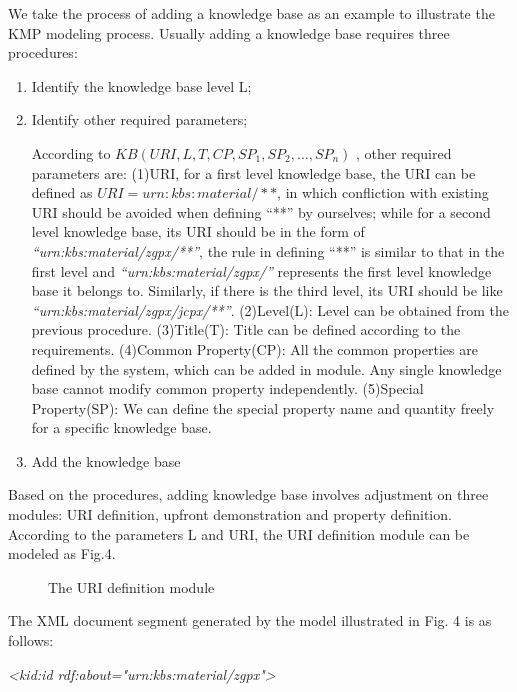 \documentclass{elsarticle}
\begin{document}
We take the process of adding a knowledge base as an example to
illustrate the KMP modeling process. Usually adding a knowledge base requires three
procedures:
\begin{enumerate}
\item Identify the knowledge base level L;
\item Identify other required parameters;  




According to $KB(URI, L, T, CP, SP_1, SP
_2,\ldots,
SP_n)$ , other required parameters are: (1)URI, for a
first level knowledge base, the URI can be defined as
$URI=urn:kbs:material/**$,
in which confliction with existing URI should be avoided when defining
“**” by ourselves; while for a second level knowledge base, its URI
should be in the form of
\textrm{\textit{“urn:kbs:material/zgpx/**”}}\textrm{, the rule in
defining “**” is similar to that in the first level and
}\textrm{\textit{“urn:kbs:material/zgpx/”}}\textrm{ represents the
first level knowledge base it belongs to. Similarly, if there is the
third level, its URI should be like
}\textrm{\textit{“urn:kbs:material/zgpx/jcpx/**”}}.
(2)Level(L): Level can be obtained from the previous
procedure.
(3)Title(T): Title can be defined according to the
requirements.
(4)Common Property(CP): All the common properties are
defined by the system, which can be added in module. Any single
knowledge base cannot modify common property independently.
(5)Special Property(SP): We can define the special property
name and quantity freely for a specific knowledge base.

\item  Add the knowledge base

\end{enumerate}
\textrm{Based on the  procedures, adding
knowledge base involves adjustment on three modules: URI
definition, upfront demonstration and property definition.
}\textrm{{According to the parameters L and
URI,}}\textrm{ the URI definition module can be modeled as Fig.4.}

  \begin{figure}[ht]
    \centering
    \scalebox{0.75}{\texttt{[image: 04]}}
    \caption{ The URI definition module}
  \end{figure}


\textrm{The XML document segment generated by the model illustrated in
Fig. 4 is as follows:}

{\itshape
{\textless}kid:id
rdf:about="urn:kbs:material/zgpx"{\textgreater}}
\end{document}
